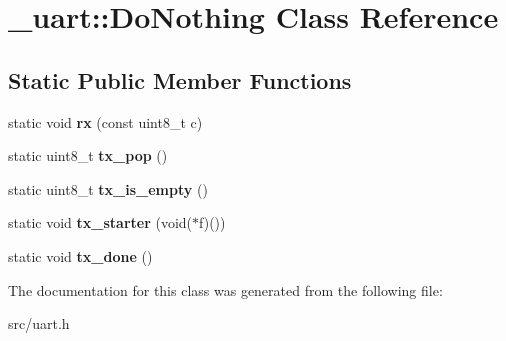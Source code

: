 \hypertarget{class__uart_1_1DoNothing}{}\section{\+\_\+uart\+:\+:Do\+Nothing Class Reference}
\label{class__uart_1_1DoNothing}
\subsection*{Static Public Member Functions}
\begin{DoxyCompactItemize}
\item 
\hypertarget{class__uart_1_1DoNothing_a5da1958995ac106d5009f962dce7ebd7}{}\label{class__uart_1_1DoNothing_a5da1958995ac106d5009f962dce7ebd7} 
static void {\bfseries rx} (const uint8\+\_\+t c)
\item 
\hypertarget{class__uart_1_1DoNothing_a35623aa16751e5dbe382d95c0b3226d5}{}\label{class__uart_1_1DoNothing_a35623aa16751e5dbe382d95c0b3226d5} 
static uint8\+\_\+t {\bfseries tx\+\_\+pop} ()
\item 
\hypertarget{class__uart_1_1DoNothing_af4958b5945ef09cc249afade14d41c0b}{}\label{class__uart_1_1DoNothing_af4958b5945ef09cc249afade14d41c0b} 
static uint8\+\_\+t {\bfseries tx\+\_\+is\+\_\+empty} ()
\item 
\hypertarget{class__uart_1_1DoNothing_ac3db5f40bb9cfa56523ff831c4bc4971}{}\label{class__uart_1_1DoNothing_ac3db5f40bb9cfa56523ff831c4bc4971} 
static void {\bfseries tx\+\_\+starter} (void($\ast$f)())
\item 
\hypertarget{class__uart_1_1DoNothing_a747b237efe72975ed73f1d2d929cef17}{}\label{class__uart_1_1DoNothing_a747b237efe72975ed73f1d2d929cef17} 
static void {\bfseries tx\+\_\+done} ()
\end{DoxyCompactItemize}


The documentation for this class was generated from the following file\+:\begin{DoxyCompactItemize}
\item 
src/uart.\+h\end{DoxyCompactItemize}
